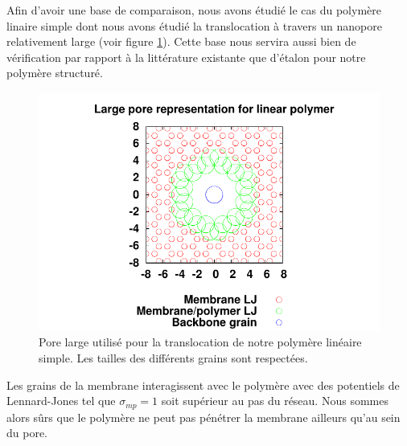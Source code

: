Afin d'avoir une base de comparaison, nous avons étudié le cas du polymère linaire simple dont nous avons étudié la translocation à travers un nanopore relativement large (voir figure \ref{porelargesimplepol}). Cette base nous servira aussi bien de vérification par rapport à la littérature existante que d'étalon pour notre polymère structuré.


\begin{figure}[H]
\begin{center}
\includegraphics[width=1\textwidth]{simplepolpore.pdf}


\caption[Polymère simple dans le pore]{Pore large utilisé pour la translocation de notre polymère linéaire simple. Les tailles des différents grains sont respectées. }
\label{porelargesimplepol}
\end{center}
\end{figure}

Les grains de la membrane interagissent avec le polymère avec des potentiels de Lennard-Jones tel que $\sigma_{mp}=1$ soit supérieur au pas du réseau. Nous sommes alors sûrs que le polymère ne peut pas pénétrer la membrane ailleurs qu'au sein du pore.\\


